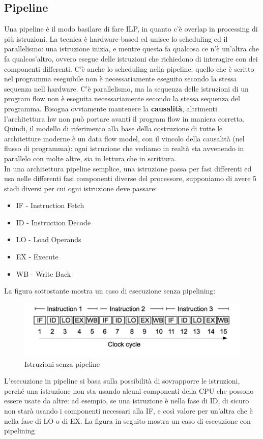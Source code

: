 \documentclass[14pt, oneside]{book}
\begin{document}
\subsection{Pipeline}
Una pipeline è il modo basilare di fare ILP, in quanto c'è overlap in processing di più istruzioni. La tecnica è hardware-based ed unisce lo scheduling ed il parallelismo: una istruzione inizia, e mentre questa fa qualcosa ce n'è un'altra che fa qualcos'altro, ovvero esegue delle istruzioni che richiedono di interagire con dei componenti differenti. C'è anche lo scheduling nella pipeline: quello che è scritto nel programma eseguibile non è necessariamente eseguito secondo la stessa sequenza nell hardware. C'è parallelismo, ma la sequenza delle istruzioni di un program flow non è eseguita necessariamente secondo la stessa sequenza del programma. Bisogna ovviamente mantenere la \textbf{causalità}, altrimenti l'architettura hw non può portare avanti il program flow in maniera corretta. Quindi, il modello di riferimento alla base della costruzione di tutte le architetture moderne è un data flow model, con il vincolo della causalità (nel flusso di programma): ogni istruzione che vediamo in realtà sta avvenendo in parallelo con molte altre, sia in lettura che in scrittura.\\ In una architettura pipeline semplice, una istruzione passa per fasi differenti ed usa nelle differenti fasi componenti diverse del processore, supponiamo di avere 5 stadi diversi per cui ogni istruzione deve passare:
\begin{itemize}
\item IF - Instruction Fetch
\item ID - Instruction Decode
\item LO - Load Operands
\item EX - Execute
\item WB - Write Back
\end{itemize}
La figura sottostante mostra un caso di esecuzione senza pipelining:
\begin{figure}[ht!]
\includegraphics[scale=0.3]{immagini/no-pipeline}
\caption{Istruzioni senza pipeline}
\end{figure}
L'esecuzione in pipeline si basa sulla possibilità di sovrapporre le istruzioni, perché una istruzione non sta usando alcuni componenti della CPU che possono essere usate da altre: ad esempio, se una istruzione è nella fase di ID, di sicuro non starà usando i componenti necessari alla IF, e così valore per un'altra che è nella fase di LO o di EX. La figura in seguito mostra un caso di esecuzione con pipelining 
\end{document}

